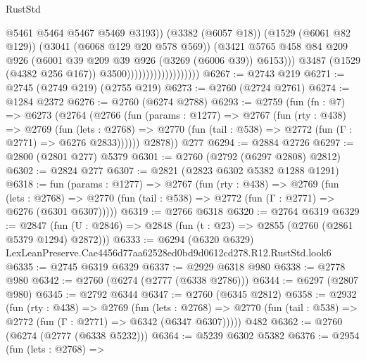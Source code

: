 \begin{lexlean}{RustStd}
\begin{coremodule}
                                                @5461
                                                @5464
                                                @5467
                                                @5469
                                                @3193))
                                            (@3382 (@6057 @18))
                                            (@1529 (@6061 @82 @129))
                                            (@3041 (@6068 @129 @20 @578 @569))
                                            (@3421
                                              @5765
                                              @458
                                              @84
                                              @209
                                              @926
                                              (@6001 @39 @209 @39 @926 (@3269 (@6006 @39)) @6153)))
                                          @3487
                                          (@1529 (@4382 @256 @167))
                                          @3500)))))))))))))))))))
@6267 := @2743 @219
@6271 := @2745 (@2749 @219) (@2755 @219)
@6273 := @2760 (@2724 @2761)
@6274 := @1284 @2372
@6276 := @2760 (@6274 @2788)
@6293 := @2759
    (fun (fn : @7) =>
    @6273
      (@2764
        (@2766
          (fun (params : @1277) =>
          @2767
            (fun (rty : @438) =>
            @2769
              (fun (lets : @2768) =>
              @2770 (fun (tail : @538) => @2772 (fun (Γ : @2771) => @6276 @2833))))))
        @2878))
    @277
@6294 := @2884 @2726
@6297 := @2800 (@2801 @277) @5379
@6301 := @2760 (@2792 (@6297 @2808) @2812)
@6302 := @2824 @277
@6307 := @2821 (@2823 @6302 @5382 @1288 @1291)
@6318 := fun (params : @1277) =>
  @2767
    (fun (rty : @438) =>
    @2769
      (fun (lets : @2768) =>
      @2770 (fun (tail : @538) => @2772 (fun (Γ : @2771) => @6276 (@6301 @6307)))))
@6319 := @2766 @6318
@6320 := @2764 @6319
@6329 := @2847 (fun (U : @2846) => @2848 (fun (t : @23) => @2855 (@2760 (@2861 @5379 @1294) @2872)))
@6333 := @6294 (@6320 @6329) LexLeanPreserve.Cae4456d77aa62528ed0bd9d0612cd278.R12.RustStd.look6
@6335 := @2745 @6319 @6329
@6337 := @2929 @6318 @980
@6338 := @2778 @980
@6342 := @2760 (@6274 (@2777 (@6338 @2786)))
@6344 := @6297 (@2807 @980)
@6345 := @2792 @6344
@6347 := @2760 (@6345 @2812)
@6358 := @2932
    (fun (rty : @438) =>
    @2769
      (fun (lets : @2768) =>
      @2770 (fun (tail : @538) => @2772 (fun (Γ : @2771) => @6342 (@6347 @6307)))))
    @482
@6362 := @2760 (@6274 (@2777 (@6338 @5232)))
@6364 := @5239 @6302 @5382
@6376 := @2954
    (fun (lets : @2768) =>

\end{coremodule}
\end{lexlean}
